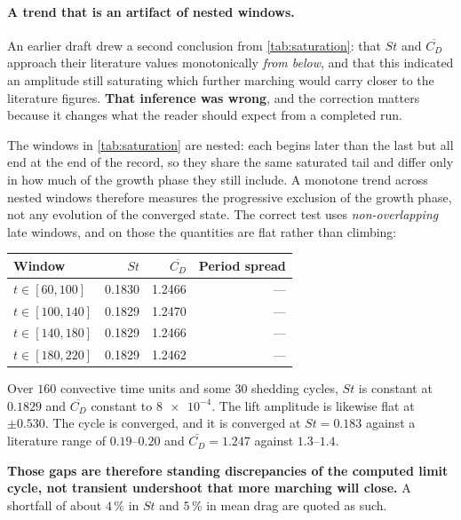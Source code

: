 \paragraph{A trend that is an artifact of nested windows.} An earlier draft drew a
second conclusion from \cref{tab:saturation}: that $St$ and $\overline{C_D}$ approach
their literature values monotonically \emph{from below}, and that this indicated an
amplitude still saturating which further marching would carry closer to the literature
figures. \textbf{That inference was wrong}, and the correction matters because it
changes what the reader should expect from a completed run.

The windows in \cref{tab:saturation} are nested: each begins later than the last but
all end at the end of the record, so they share the same saturated tail and differ only
in how much of the growth phase they still include. A monotone trend across nested
windows therefore measures the progressive exclusion of the growth phase, not any
evolution of the converged state. The correct test uses \emph{non-overlapping} late
windows, and on those the quantities are flat rather than climbing:

\begin{center}
\begin{tabular}{lrrr}
  \toprule
  Window & $St$ & $\overline{C_D}$ & Period spread \\
  \midrule
  $t\in[60,100]$ & \num{0.1830} & \num{1.2466} & --- \\
  $t\in[100,140]$ & \num{0.1829} & \num{1.2470} & --- \\
  $t\in[140,180]$ & \num{0.1829} & \num{1.2466} & --- \\
  $t\in[180,220]$ & \num{0.1829} & \num{1.2462} & --- \\
  \bottomrule
\end{tabular}
\end{center}

\noindent Over $160$ convective time units and some $30$ shedding cycles, $St$ is
constant at $0.1829$ and $\overline{C_D}$ constant to $\num{8e-4}$. The lift amplitude
is likewise flat at $\pm0.530$. The cycle is converged, and it is converged at
$St=0.183$ against a literature range of $0.19$--$0.20$ and
$\overline{C_D}=1.247$ against $1.3$--$1.4$.

\textbf{Those gaps are therefore standing discrepancies of the computed limit cycle,
not transient undershoot that more marching will close.} A shortfall of about $4\,\%$
in $St$ and $5\,\%$ in mean drag are quoted as such.


